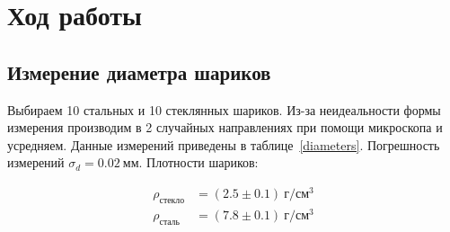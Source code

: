 \documentclass[a4paper, 12pt]{article}
\begin{document}
    \section{Ход работы}
    \subsection{Измерение диаметра шариков}

    Выбираем 10 стальных и 10 стеклянных шариков. Из-за неидеальности формы измерения производим в 2 случайных направлениях при помощи микроскопа и усредняем. Данные измерений приведены в таблице~\ref{diameters}. Погрешность измерений $\sigma_d = 0.02~мм$. Плотности шариков:

    \begin{align*}
        \rho_{стекло}&=(2.5 \pm 0.1)~г/см^3\\
        \rho_{сталь}&=(7.8 \pm 0.1)~г/см^3
    \end{align*}
\end{document}
